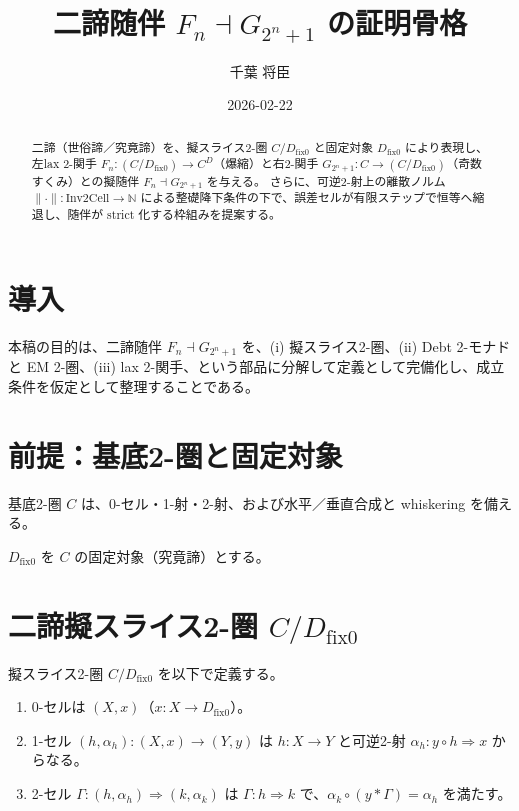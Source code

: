 \documentclass[a4paper,11pt]{article}
\title{二諦随伴 \texorpdfstring{$F_n \dashv G_{2^n+1}$}{Fn dashv G(2^n+1)} の証明骨格}
\author{千葉 将臣}
\date{2026-02-22}
\begin{document}
\maketitle

\begin{abstract}
二諦（世俗諦／究竟諦）を、擬スライス2-圏 $C/D_{\mathrm{fix}0}$ と固定対象 $D_{\mathrm{fix}0}$ により表現し、
左lax 2-関手 $F_n:(C/D_{\mathrm{fix}0})\to C^D$（爆縮）と右2-関手 $G_{2^n+1}:C\to (C/D_{\mathrm{fix}0})$（奇数すくみ）との擬随伴
$F_n \dashv G_{2^n+1}$ を与える。
さらに、可逆2-射上の離散ノルム $\|\cdot\|:\mathrm{Inv2Cell}\to\mathbb{N}$ による整礎降下条件の下で、誤差セルが有限ステップで恒等へ縮退し、随伴が strict 化する枠組みを提案する。
\end{abstract}

\section{導入}
本稿の目的は、二諦随伴 $F_n \dashv G_{2^n+1}$ を、(i) 擬スライス2-圏、(ii) Debt 2-モナドと EM 2-圏、(iii) lax 2-関手、という部品に分解して定義として完備化し、成立条件を仮定として整理することである。

\section{前提：基底2-圏と固定対象}
\begin{definition}[基底2-圏]
基底2-圏 $C$ は、0-セル・1-射・2-射、および水平／垂直合成と whiskering を備える。
\end{definition}

\begin{definition}[固定対象]
$D_{\mathrm{fix}0}$ を $C$ の固定対象（究竟諦）とする。
\end{definition}

\section{二諦擬スライス2-圏 \texorpdfstring{$C/D_{\mathrm{fix}0}$}{C/Dfix0}}
\begin{definition}[擬スライス2-圏]
擬スライス2-圏 $C/D_{\mathrm{fix}0}$ を以下で定義する。
\begin{enumerate}
  \item 0-セルは $(X,x)$（$x:X\to D_{\mathrm{fix}0}$）。
  \item 1-セル $(h,\alpha_h):(X,x)\to(Y,y)$ は $h:X\to Y$ と可逆2-射 $\alpha_h:y\circ h\Rightarrow x$ からなる。
  \item 2-セル $\Gamma:(h,\alpha_h)\Rightarrow(k,\alpha_k)$ は $\Gamma:h\Rightarrow k$ で、$\alpha_k\circ(y*\Gamma)=\alpha_h$ を満たす。
\end{enumerate}
\end{definition}
\end{document}
